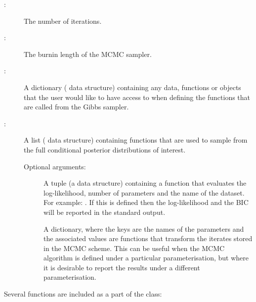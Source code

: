 \documentclass[article]{jss}
\begin{document}
\begin{description}
\item[:]  The number of iterations. 
\item[:]  The burnin length of the MCMC sampler. 
\item[:] A dictionary ( data structure)
  containing any data, functions or objects that the user would like
  to have access to when defining the functions that are called from
  the Gibbs sampler.
\item[:] A list ( data structure)
  containing functions that are used to sample from the full
  conditional posterior distributions of interest.
\item[] Optional arguments:
  
  \begin{description}
  \item[] A tuple (a  data structure)
    containing a function that evaluates the log-likelihood, number of
    parameters and the name of the dataset. For example: .  If this is defined then the
    log-likelihood and the BIC will be reported in the standard
    output.
  \item[] A dictionary, where the keys are the names
    of the parameters and the associated values are functions that
    transform the iterates stored in the MCMC scheme. This can be
    useful when the MCMC algorithm is defined under a particular
    parameterisation, but where it is desirable to report the results
    under a different parameterisation.
  \end{description}
\end{description}
Several functions are included as a part of the class:
\end{document}
